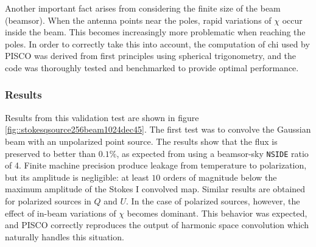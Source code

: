 \documentclass[a4paper,fleqn]{cas-dc}\sloppy
\begin{document}
Another important fact arises from considering the finite size of the beam (beamsor). When the antenna points near the poles, rapid variations of $\chi$ occur inside the beam. This becomes increasingly more problematic when reaching the poles. In order to correctly take this into account, the computation of chi used by PISCO was derived from first principles using spherical trigonometry, and the code was thoroughly tested and benchmarked to provide optimal performance. 

\subsubsection{Results}

Results from this validation test are shown in figure \ref{fig::stokesqsource256beam1024dec45}. The first test was to convolve the Gaussian beam with an unpolarized point source. The results show that the flux is preserved to better than $0.1\%$, as expected from using a beamsor-sky \texttt{NSIDE} ratio of 4. Finite machine precision produce leakage from temperature to polarization, but its amplitude is negligible: at least $10$ orders of magnitude below the maximum amplitude of the Stokes I convolved map. Similar results are obtained for polarized sources in $Q$ and $U$. In the case of polarized sources, however, the effect of in-beam variations of $\chi$ becomes dominant. This behavior was expected, and PISCO correctly reproduces the output of harmonic space convolution which naturally handles this situation.
\end{document}
